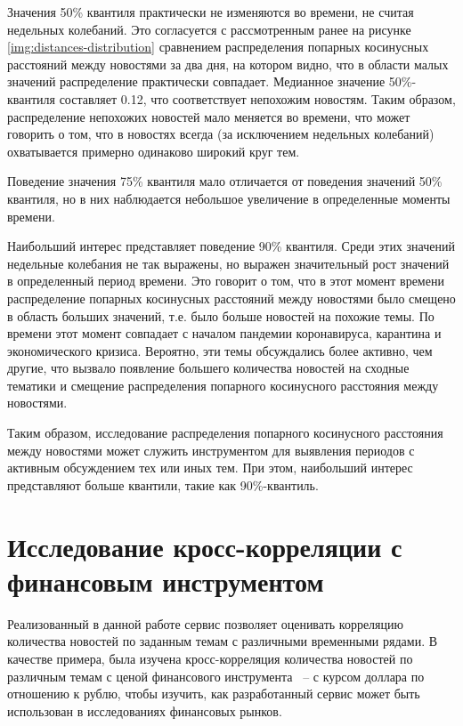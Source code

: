 Значения 50\% квантиля практически не изменяются во времени, не считая недельных колебаний. Это согласуется с рассмотренным ранее на рисунке \ref{img:distances-distribution} сравнением распределения попарных косинусных расстояний между новостями за два дня, на котором видно, что в области малых значений распределение практически совпадает. Медианное значение 50\%-квантиля составляет 0.12, что соответствует непохожим новостям. Таким образом, распределение непохожих новостей мало меняется во времени, что может говорить о том, что в новостях всегда (за исключением недельных колебаний) охватывается примерно одинаково широкий круг тем.

Поведение значения 75\% квантиля мало отличается от поведения значений 50\% квантиля, но в них наблюдается небольшое увеличение в определенные моменты времени.

Наибольший интерес представляет поведение 90\% квантиля. Среди этих значений недельные колебания не так выражены, но выражен значительный рост значений в определенный период времени. Это говорит о том, что в этот момент времени распределение попарных косинусных расстояний между новостями было смещено в область больших значений, т.е. было больше новостей на похожие темы. По времени этот момент совпадает с началом пандемии коронавируса, карантина и экономического кризиса. Вероятно, эти темы обсуждались более активно, чем другие, что вызвало появление большего количества новостей на сходные тематики и смещение распределения попарного косинусного расстояния между новостями.

Таким образом, исследование распределения попарного косинусного расстояния между новостями может служить инструментом для выявления периодов с активным обсуждением тех или иных тем. При этом, наибольший интерес представляют больше квантили, такие как 90\%-квантиль.

\section{Исследование кросс-корреляции с финансовым инструментом}

Реализованный в данной работе сервис позволяет оценивать корреляцию количества новостей по заданным темам с различными временными рядами. В качестве примера, была изучена кросс-корреляция количества новостей по различным темам с ценой финансового инструмента ~-- с курсом доллара по отношению  к рублю, чтобы изучить, как разработанный сервис может быть использован в исследованиях финансовых рынков.

